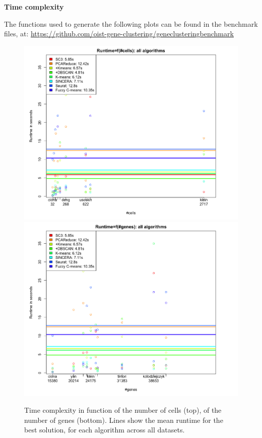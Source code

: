 \documentclass{report}
\begin{document}
{\bigskip
\noindent \textbf{Time complexity}
\bigskip

The functions used to generate the following plots can be found in the benchmark files, at: {\url{https://github.com/oist-gene-clustering/geneclusteringbenchmark}}\\

\begin{figure}[H]
\centering
\subfigure\includegraphics[scale=0.4]{benchmark/timeAllCell.png}
\subfigure\includegraphics[scale=0.4]{benchmark/timeAllGene.png}
\caption{Time complexity in function of the number of cells (top), of the number of genes (bottom). Lines show the mean runtime for the best solution, for each algorithm across all datasets.}
\label{time1}
\end{figure}

}
\end{document}
